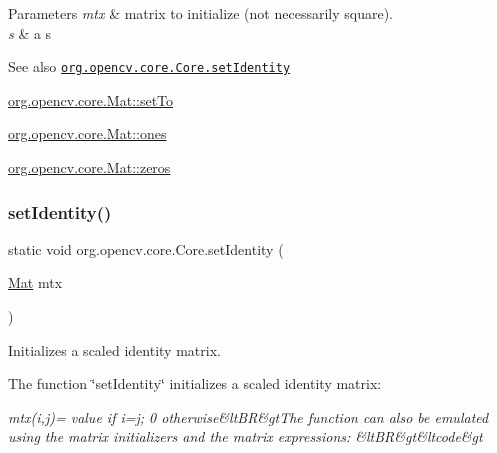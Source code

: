 \begin{DoxyParams}{Parameters}
{\em mtx} & matrix to initialize (not necessarily square). \\
\hline
{\em s} & a s\\
\hline
\end{DoxyParams}
\begin{DoxySeeAlso}{See also}
\href{http://docs.opencv.org/modules/core/doc/operations_on_arrays.html#setidentity}{\tt org.\+opencv.\+core.\+Core.\+set\+Identity} 

\mbox{\hyperlink{classorg_1_1opencv_1_1core_1_1_mat_a9316a305061d8ef51b7e7355d5e7440d}{org.\+opencv.\+core.\+Mat\+::set\+To}} 

\mbox{\hyperlink{classorg_1_1opencv_1_1core_1_1_mat_a34d703df023730d043298601b6962f57}{org.\+opencv.\+core.\+Mat\+::ones}} 

\mbox{\hyperlink{classorg_1_1opencv_1_1core_1_1_mat_aff41070138369b96f792b19f01ab00d9}{org.\+opencv.\+core.\+Mat\+::zeros}} 
\end{DoxySeeAlso}
\mbox{\label{classorg_1_1opencv_1_1core_1_1_core_a9907da2380a9f7de76f9a82dc168cf56}} 
\subsubsection{\texorpdfstring{set\+Identity()}{setIdentity()}\hspace{0.1cm}{\footnotesize\ttfamily [2/2]}}
{\footnotesize\ttfamily static void org.\+opencv.\+core.\+Core.\+set\+Identity (\begin{DoxyParamCaption}\item[{\mbox{\hyperlink{classorg_1_1opencv_1_1core_1_1_mat}{Mat}}}]{mtx }\end{DoxyParamCaption})\hspace{0.3cm}{\ttfamily [static]}}

Initializes a scaled identity matrix.

The function \char`\"{}set\+Identity\char`\"{} initializes a scaled identity matrix\+:

{\itshape mtx(i,j)= value if i=j; 0 otherwise\&lt\+BR\&gt\+The function can also be emulated using the matrix initializers and the matrix expressions\+: \&lt\+BR\&gt\&ltcode\&gt}


